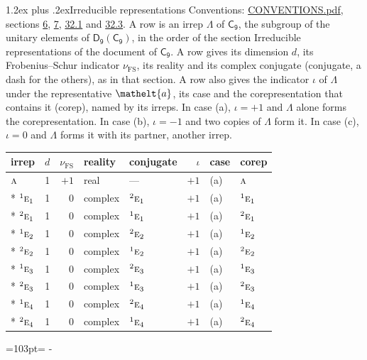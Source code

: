 \documentclass[10pt,a4paper]{article}
\makeatletter
\renewcommand\section{\@startsection{section}{1}{\z@}{-3ex plus -1ex minus -.2ex}%
  {1.2ex plus .2ex}{\normalfont\large\sffamily\bfseries\color{parttitle}}}
\newcommand{\needspace}[1]{\par\penalty-100\begingroup\dimen0=#1\relax\dimen2=\pagegoal
  \advance\dimen2-\pagetotal\ifdim\dimen0>\dimen2\relax\ifdim\dimen2>0pt\vfil\break\fi\fi
  \endgroup}
\numberwithin{equation}{section}
\newcommand{\eltfont}[1]{{\let\sigma\eltsigma\mathelt{#1}}}
\newcommand{\grp}[1]{\mathsf{#1}}
\newcommand{\irr}[1]{\text{\normalfont\scshape #1}}
\newcommand{\conjpair}[1]{{}^{#1}}
\newcommand{\elt}[1]{\eltfont{#1}}
\newcommand{\fsind}{\nu_{\mathrm{FS}}}
\makeatother
\begin{document}
\section{Irreducible representations}\label{s:irreps}
Conventions: \href{../../CONVENTIONS.pdf}{CONVENTIONS.pdf}, sections \href{../../../rotation/CONVENTIONS.pdf\#conv.6}{6}, \href{../../../rotation/CONVENTIONS.pdf\#conv.7}{7}, \href{../../CONVENTIONS.pdf\#conv.32.1}{32.1} and \href{../../CONVENTIONS.pdf\#conv.32.3}{32.3}.
\leavevmode\label{n:irrep.Delta}A row is an irrep $\Lambda$ of $\grp{C_{9}}$, the subgroup of the unitary elements of $\grp{D_{9}}(\grp{C_{9}})$, in the order of the section Irreducible representations of the document of \href{../../../rotation/data/pdf/C9.pdf}{$\grp{C_{9}}$}. \label{n:index.dimension}\label{n:index.frobenius}\label{n:head.irrep}\label{n:head.reality}\label{n:head.conjugate}A row gives its dimension $d$, its Frobenius--Schur indicator $\fsind$, its reality and its complex conjugate (conjugate, a dash for the others), as in that section. \label{n:head.case.corep}\label{n:head.corep}A row also gives the indicator $\iota$ of $\Lambda$ under the representative $\elt{a}$, its case and the corepresentation that contains it (corep), named by its irreps. In case (a), $\iota = +1$ and $\Lambda$ alone forms the corepresentation. In case (b), $\iota = -1$ and two copies of $\Lambda$ form it. In case (c), $\iota = 0$ and $\Lambda$ forms it with its partner, another irrep.
\setlength{\emergencystretch}{2em}\par\setlength{\emergencystretch}{0pt}
{\small\renewcommand{\arraystretch}{1.25}\setlength{\tabcolsep}{4pt}\begin{longtable}{@{}lrrllrll@{}}\toprule
irrep & $d$ & $\fsind$ & reality & conjugate & $\iota$ & case & corep\\\midrule\endhead
\bottomrule\endfoot\endlastfoot
$\irr{a}$ & 1 & $+1$ & real & --- & $+1$ & (a) & $\irr{a}$\\*
$\conjpair{1}\irr{e}_{1}$ & 1 & $0$ & complex & $\conjpair{2}\irr{e}_{1}$ & $+1$ & (a) & $\conjpair{1}\irr{e}_{1}$\\*
$\conjpair{2}\irr{e}_{1}$ & 1 & $0$ & complex & $\conjpair{1}\irr{e}_{1}$ & $+1$ & (a) & $\conjpair{2}\irr{e}_{1}$\\*
$\conjpair{1}\irr{e}_{2}$ & 1 & $0$ & complex & $\conjpair{2}\irr{e}_{2}$ & $+1$ & (a) & $\conjpair{1}\irr{e}_{2}$\\*
$\conjpair{2}\irr{e}_{2}$ & 1 & $0$ & complex & $\conjpair{1}\irr{e}_{2}$ & $+1$ & (a) & $\conjpair{2}\irr{e}_{2}$\\*
$\conjpair{1}\irr{e}_{3}$ & 1 & $0$ & complex & $\conjpair{2}\irr{e}_{3}$ & $+1$ & (a) & $\conjpair{1}\irr{e}_{3}$\\*
$\conjpair{2}\irr{e}_{3}$ & 1 & $0$ & complex & $\conjpair{1}\irr{e}_{3}$ & $+1$ & (a) & $\conjpair{2}\irr{e}_{3}$\\*
$\conjpair{1}\irr{e}_{4}$ & 1 & $0$ & complex & $\conjpair{2}\irr{e}_{4}$ & $+1$ & (a) & $\conjpair{1}\irr{e}_{4}$\\*
$\conjpair{2}\irr{e}_{4}$ & 1 & $0$ & complex & $\conjpair{1}\irr{e}_{4}$ & $+1$ & (a) & $\conjpair{2}\irr{e}_{4}$\\
\bottomrule\end{longtable}}
\needspace{103pt}
\end{document}
